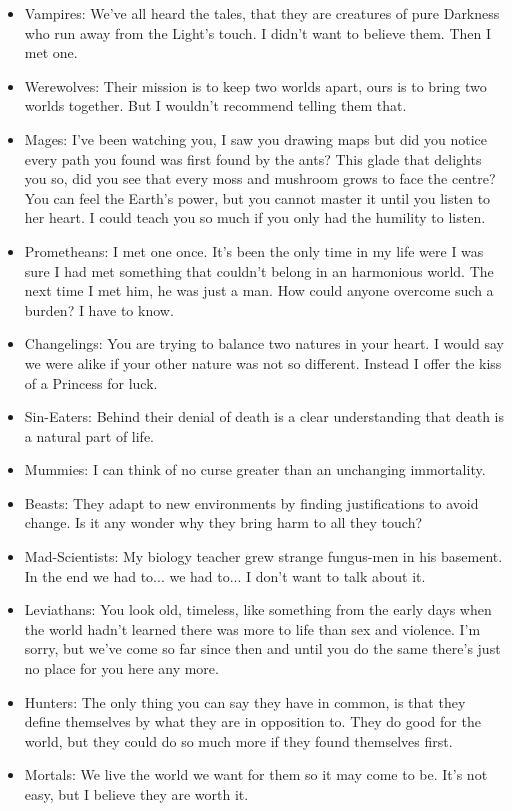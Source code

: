 \begin{itemize}
\item Vampires: We’ve all heard the tales, that they are creatures of pure Darkness who run away from the Light’s touch. I didn’t want to believe them. Then I met one.
\item Werewolves: Their mission is to keep two worlds apart, ours is to bring two worlds together. But I wouldn't recommend telling them that. 
\item Mages: I've been watching you, I saw you drawing maps but did you notice every path you found was first found by the ants? This glade that delights you so, did you see that every moss and mushroom grows to face the centre? You can feel the Earth's power, but you cannot master it until you listen to her heart. I could teach you so much if you only had the humility to listen.
\item Prometheans: I met one once. It’s been the only time in my life were I was sure I had met something that couldn’t belong in an harmonious world. The next time I met him, he was just a man. How could anyone overcome such a burden? I have to know.
\item Changelings: You are trying to balance two natures in your heart. I would say we were alike if your other nature was not so different. Instead I offer the kiss of a Princess for luck.
\item Sin-Eaters: Behind their denial of death is a clear understanding that death is a natural part of life. 
\item Mummies: I can think of no curse greater than an unchanging immortality.  
\item Beasts: They adapt to new environments by finding justifications to avoid change. Is it any wonder why they bring harm to all they touch?
\item Mad-Scientists: My biology teacher grew strange fungus-men in his basement. In the end we had to... we had to... I don’t want to talk about it.
\item Leviathans: You look old, timeless, like something from the early days when the world hadn't learned there was more to life than sex and violence. I'm sorry, but we've come so far since then and until you do the same there's just no place for you here any more.

\item Hunters: The only thing you can say they have in common, is that they define themselves by what they are in opposition to. They do good for the world, but they could do so much more if they found themselves first.
\item Mortals: We live the world we want for them so it may come to be. It’s not easy, but I believe they are worth it. \end{itemize}

